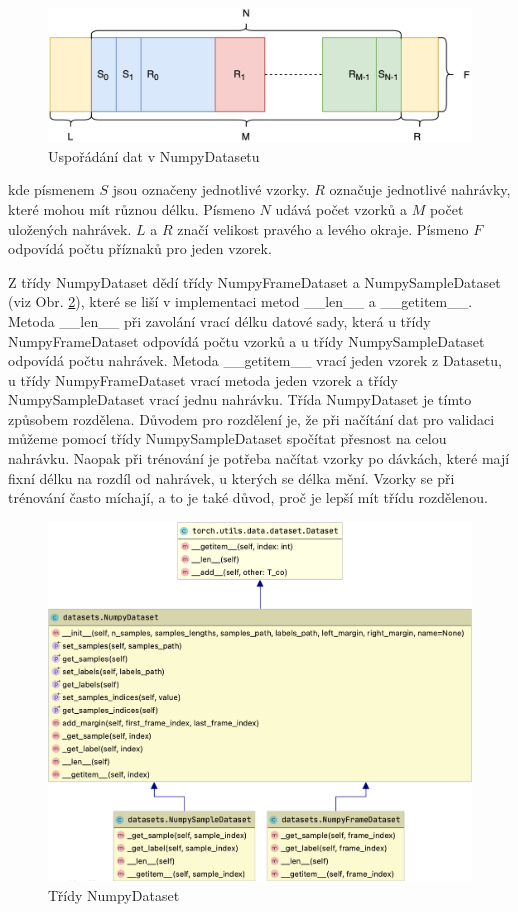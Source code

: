 \documentclass[FM,BP]{tulthesis}
\begin{document}
\begin{figure}[htbp]
\centerline{\includegraphics[scale=.125]{dataset_arrangement.png}}
\caption{Uspořádání dat v NumpyDatasetu}
\label{fig:data_arrangement}
\end{figure}
\FloatBarrier

kde písmenem $ S $ jsou označeny jednotlivé vzorky. $ R $ označuje jednotlivé nahrávky, které mohou mít různou délku. Písmeno $ N $ udává počet vzorků a $ M $ počet uložených nahrávek. $ L $ a $ R $ značí velikost pravého a levého okraje. Písmeno $ F $ odpovídá počtu příznaků pro jeden vzorek.

Z třídy NumpyDataset dědí třídy NumpyFrameDataset a NumpySampleDataset (viz Obr. \ref{fig:numpy_dataset}), které se liší v implementaci metod \_\_len\_\_ a \_\_getitem\_\_. Metoda \_\_len\_\_ při zavolání vrací délku datové sady, která u třídy NumpyFrameDataset odpovídá počtu vzorků a u třídy NumpySampleDataset odpovídá počtu nahrávek. Metoda \_\_getitem\_\_ vrací jeden vzorek z Datasetu, u třídy NumpyFrameDataset vrací metoda jeden vzorek a třídy NumpySampleDataset vrací jednu nahrávku. Třída NumpyDataset je tímto způsobem rozdělena. Důvodem pro rozdělení je, že při načítání dat pro validaci můžeme pomocí třídy NumpySampleDataset spočítat přesnost na celou nahrávku. Naopak při trénování je potřeba načítat vzorky po dávkách, které mají fixní délku na rozdíl od nahrávek, u kterých se délka mění. Vzorky se při trénování často míchají, a to je také důvod, proč je lepší mít třídu rozdělenou.

\begin{figure}[h]
\centerline{\includegraphics[scale=.185]{datasets.png}}
\caption{Třídy NumpyDataset}
\label{fig:numpy_dataset}
\end{figure}
\FloatBarrier
\end{document}
